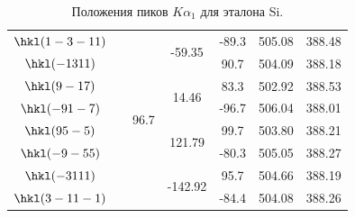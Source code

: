 \documentclass[a4paper,14pt]{extarticle}
\begin{document}
\begin{table}[ht!]
\begin{tabular}{ |c|c|c|c|c|c|c| }
        $ \hkl(1 -3 -11)$ &                         &  \multirow{10}{*}{96.7} &  \multirow{2}{*}{-59.35} &               -89.3 &              505.08 &              388.48 \\
        $  \hkl(-1 3 11)$ &                         &                         &                          &                90.7 &              504.09 &              388.18 \\
        $   \hkl(9 -1 7)$ &                         &                         &   \multirow{2}{*}{14.46} &                83.3 &              502.92 &              388.53 \\
        $  \hkl(-9 1 -7)$ &                         &                         &                          &               -96.7 &              506.04 &              388.01 \\
        $   \hkl(9 5 -5)$ &                         &                         &  \multirow{2}{*}{121.79} &                99.7 &              503.80 &              388.21 \\
        $  \hkl(-9 -5 5)$ &                         &                         &                          &               -80.3 &              505.05 &              388.27 \\
        $  \hkl(-3 11 1)$ &                         &                         & \multirow{2}{*}{-142.92} &                95.7 &              504.66 &              388.19 \\
        $ \hkl(3 -11 -1)$ &                         &                         &                          &               -84.4 &              504.08 &              388.26 \\
        \hline
    \end{tabular}
    \caption{Положения пиков $K\alpha_1$ для эталона Si.}
    \label{tab:Si}
\end{table}
\end{document}
